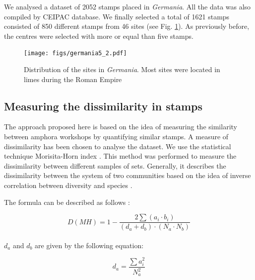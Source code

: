 \documentclass[review]{elsarticle}
\newcommand{\memo}[2]{\textcolor{#1}{#2}}
\newcommand{\xavi}[1]{\memo{magenta}{XRC: #1\\}}
\begin{document}
We analysed a dataset of 2052 stamps placed in \textit{Germania}. All the data was also compiled by CEIPAC database. We finally selected a total of 1621 stamps consisted of 850 different stamps from 46 sites (see Fig. \ref{germania}). As previously before, the centres were selected with more or equal than five stamps. 


\begin{figure}[htp]
	\centering
\texttt{[image: figs/germania5\_2.pdf]}
\caption{Distribution of the sites in \textit{Germania}. Most sites were located in limes during the Roman Empire}
\label{germania}
\end{figure}



\subsection{Measuring the dissimilarity in stamps}



The approach proposed here is based on the idea of measuring the similarity between amphora workshops by quantifying similar stamps. A measure of dissimilarity has been chosen to analyse the dataset. We use the statistical technique Morisita-Horn index \citep{morisita_measuring_1959, horn_measurement_1966}. This method was performed to measure the dissimilarity between different samples of sets. Generally, it describes the dissimilarity between the system of two communities based on the idea of inverse correlation between diversity and species \citep{magurran_why_1988}.

The formula can be described as follows \citep{magurran_measuring_2013}:

\begin{equation}
D(MH) = 1- \frac{2 \sum(a_{i} \cdot b_{i})}{(d_{a} + d_{b}) \cdot (N_{a} \cdot N_{b})}
\end{equation} \\

$d_{a}$ and $d_{b}$ are given by the following equation:

\begin{equation}
d_{a} = \frac{\sum a_{i}^{2}}{N_{a}^{2}} 
\end{equation} \\
\end{document}

